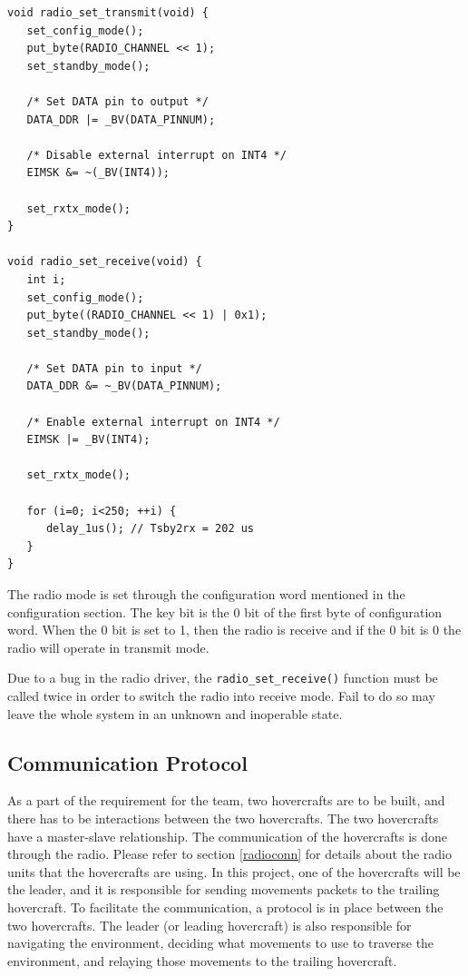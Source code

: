 \begin{lstlisting}[float=ht, 
                   caption={Radio Modes}]
void radio_set_transmit(void) {
   set_config_mode();
   put_byte(RADIO_CHANNEL << 1);
   set_standby_mode();

   /* Set DATA pin to output */
   DATA_DDR |= _BV(DATA_PINNUM);

   /* Disable external interrupt on INT4 */
   EIMSK &= ~(_BV(INT4));

   set_rxtx_mode();
} 

void radio_set_receive(void) {
   int i;
   set_config_mode();
   put_byte((RADIO_CHANNEL << 1) | 0x1);
   set_standby_mode();

   /* Set DATA pin to input */
   DATA_DDR &= ~_BV(DATA_PINNUM);

   /* Enable external interrupt on INT4 */
   EIMSK |= _BV(INT4);

   set_rxtx_mode();

   for (i=0; i<250; ++i) {
      delay_1us(); // Tsby2rx = 202 us
   }
}
\end{lstlisting}

The radio mode is set through the configuration word mentioned in the
configuration section. The key bit is the 0 bit of the first byte of
configuration word. When the 0 bit is set to 1, then the radio is receive and if
the 0 bit is 0 the radio will operate in transmit mode.

Due to a bug in the radio driver, the \texttt{radio\_set\_receive()} function
must be called twice in order to switch the radio into receive mode.  Fail to do
so may leave the whole system in an unknown and inoperable state.

\subsection{Communication Protocol}
As a part of the requirement for the team, two hovercrafts are to be built, and
there has to be interactions between the two hovercrafts. The two hovercrafts
have a master-slave relationship. The communication of
the hovercrafts is done through the radio. Please refer to section
\ref{radioconn} for details about the radio units that the hovercrafts
are using. In this project, one of the hovercrafts will be the leader, and
it is responsible for sending movements packets to the trailing hovercraft. To
facilitate the communication, a protocol is in place between the two
hovercrafts. The leader (or leading hovercraft) is also responsible for
navigating the environment, deciding what movements to use to traverse the
environment, and relaying those movements to the trailing hovercraft.

